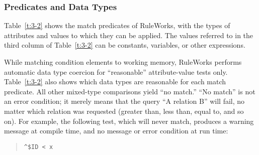 \subsubsection*{Predicates and Data Types}

Table~\ref{t:3-2} shows the match predicates of RuleWorks, with the
types of attributes and values to which they can be applied. The
values referred to in the third column of Table~\ref{t:3-2} can be constants,
variables, or other expressions.

While matching condition elements to working memory, RuleWorks
performs automatic data type coercion for ``reasonable''
attribute-value tests only. Table~\ref{t:3-2} also shows which data types are
reasonable for each match predicate. All other mixed-type comparisons
yield ``no match.'' ``No match'' is not an error condition; it merely
means that the query ``A relation B'' will fail, no matter which
relation was requested (greater than, less than, equal to, and so
on). For example, the following test, which will never match, produces
a warning message at compile time, and no message or error condition
at run time:
\begin{quote}
\begin{verbatim}
^$ID < x
\end{verbatim}
\end{quote}

